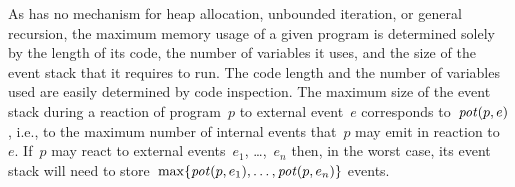 
As \CEU has no mechanism for heap allocation, unbounded iteration, or
general recursion, the maximum memory usage of a given \CEU program is
determined solely by the length of its code, the number of variables it
uses, and the size of the event stack that it requires to run.  The code
length and the number of variables used are easily determined by code
inspection.  The maximum size of the event stack during a reaction of
program~$p$ to external event~$e$ corresponds to~$\operatorname{\mathit{pot}}(p,e)$, i.e., to the
maximum number of internal events that~$p$ may emit in reaction to~$e$.
If~$p$ may react to external events~$e_1$, \dots,~$e_n$ then, in the worst
case, its event stack will need to
store~$\max\{\operatorname{\mathit{pot}}(p,e_1),\dots,\operatorname{\mathit{pot}}(p,e_n)\}$ events.


